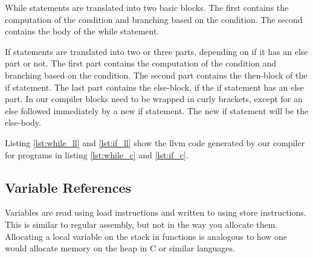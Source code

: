 While statements are translated into two basic blocks. The first contains the computation of the condition and branching based on the condition. The second contains the body of the while statement.

If statements are translated into two or three parts, depending on if it has an else part or not. The first part contains the computation of the condition and branching based on the condition. The second part contains the then-block of the if statement. The last part contains the else-block, if the if statement has an else part. In our compiler blocks need to be wrapped in curly brackets, except for an else followed immediately by a new if statement. The new if statement will be the else-body.

Listing \ref{lst:while_ll} and \ref{lst:if_ll} show the llvm code generated by our compiler for programs in listing \ref{lst:while_c} and \ref{lst:if_c}.












\subsection{Variable References}

Variables are read using load instructions and written to using store instructions. This is similar to regular assembly, but not in the way you allocate them.
Allocating a local variable on the stack in functions is analogous to how one would allocate memory on the heap in C or similar languages.

